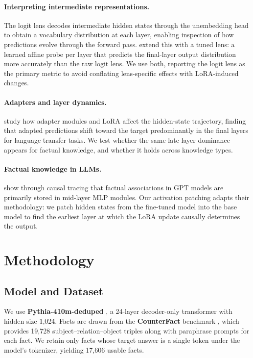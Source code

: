 \documentclass[11pt]{article}
\begin{document}
\paragraph{Interpreting intermediate representations.}
The logit lens \citep{logitlens2020} decodes intermediate hidden states through
the unembedding head to obtain a vocabulary distribution at each layer, enabling
inspection of how predictions evolve through the forward pass.
\citet{belrose2023eliciting} extend this with a tuned lens: a learned affine
probe per layer that predicts the final-layer output distribution more
accurately than the raw logit lens.
We use both, reporting the logit lens as the primary metric to avoid
conflating lens-specific effects with LoRA-induced changes.

\paragraph{Adapters and layer dynamics.}
\citet{alabi2024hidden} study how adapter modules and LoRA affect the
hidden-state trajectory, finding that adapted predictions shift toward the
target predominantly in the final layers for language-transfer tasks.
We test whether the same late-layer dominance appears for factual knowledge,
and whether it holds across knowledge types.

\paragraph{Factual knowledge in LLMs.}
\citet{meng2022locating} show through causal tracing that factual associations
in GPT models are primarily stored in mid-layer MLP modules.
Our activation patching adapts their methodology: we patch hidden states from
the fine-tuned model into the base model to find the earliest layer at which
the LoRA update causally determines the output.

\section{Methodology}

\subsection{Model and Dataset}
We use \textbf{Pythia-410m-deduped} \citep{biderman2023pythia}, a 24-layer
decoder-only transformer with hidden size 1{,}024.
Facts are drawn from the \textbf{CounterFact} benchmark
\citep{meng2022locating}, which provides 19{,}728 subject--relation--object
triples along with paraphrase prompts for each fact.
We retain only facts whose target answer is a single token under the model's
tokenizer, yielding 17{,}606 usable facts.
\end{document}

